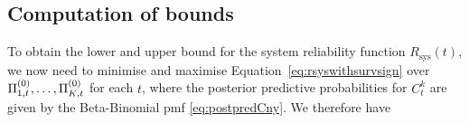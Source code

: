 \documentclass[12pt, a4paper]{elsarticle}
\newcommand{\Rsys}{R_\text{sys}}
\begin{document}
\subsection{Computation of bounds}

To obtain the lower and upper bound for the system reliability function $\Rsys(t)$,
we now need to minimise and maximise Equation~\eqref{eq:rsyswithsurvsign} over $\Pi^{(0)}_{1,t}, \ldots, \Pi^{(0)}_{K,t}$ for each $t$,
where the posterior predictive probabilities for $C^k_t$ are given by the Beta-Binomial pmf \eqref{eq:postpredCny}.
%
We therefore have
%
\end{document}
